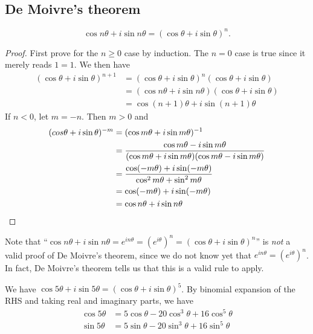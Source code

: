 \documentclass[a4paper]{article}
\begin{document}
\subsection{De Moivre's theorem}
\begin{thm}
  \[
    \cos n\theta + i\sin n\theta = (\cos\theta + i\sin\theta)^n.
  \]
\end{thm}
\begin{proof}
  First prove for the $n \geq 0$ case by induction. The $n = 0$ case is true since it merely reads $1 = 1$. We then have
  \begin{align*}
    (\cos\theta + i\sin\theta)^{n + 1} &= (\cos\theta + i\sin\theta)^n (\cos\theta + i\sin\theta)\\
    &= (\cos n\theta + i\sin n\theta )(\cos\theta + i\sin\theta)\\
    &= \cos(n+1)\theta + i\sin(n+1)\theta
  \end{align*}
  If $n < 0$, let $m = -n$. Then $m > 0$ and
  \begin{align*}
    (cos\theta + i\sin\theta)^{-m} &= (\cos m\theta + i\sin m\theta)^{-1}\\
    &= \frac{\cos m\theta - i\sin m\theta}{(\cos m\theta + i\sin m\theta)(\cos m\theta - i\sin m\theta)}\\
    &= \frac{\cos (-m\theta) + i\sin (-m\theta)}{\cos^2 m\theta + \sin^2 m\theta}\\
    &= \cos (-m\theta) + i\sin (-m\theta)\\
    &= \cos n\theta + i\sin n\theta \qedhere
  \end{align*}
\end{proof}
Note that ``$\cos n\theta + i\sin n\theta = e^{in\theta} = (e^{i\theta})^n = (\cos \theta + i\sin \theta)^n$'' is \emph{not} a valid proof of De Moivre's theorem, since we do not know yet that $e^{in\theta} = (e^{i\theta})^n$. In fact, De Moivre's theorem tells us that this is a valid rule to apply.

\begin{eg}
  We have $\cos 5\theta + i\sin5\theta = (\cos\theta + i\sin\theta)^5$. By binomial expansion of the RHS and taking real and imaginary parts, we have
  \begin{align*}
    \cos 5\theta &= 5\cos\theta - 20\cos^3\theta + 16\cos^5\theta\\
    \sin 5\theta &= 5\sin\theta - 20\sin^3\theta + 16\sin^5\theta
  \end{align*}
\end{eg}
\end{document}
